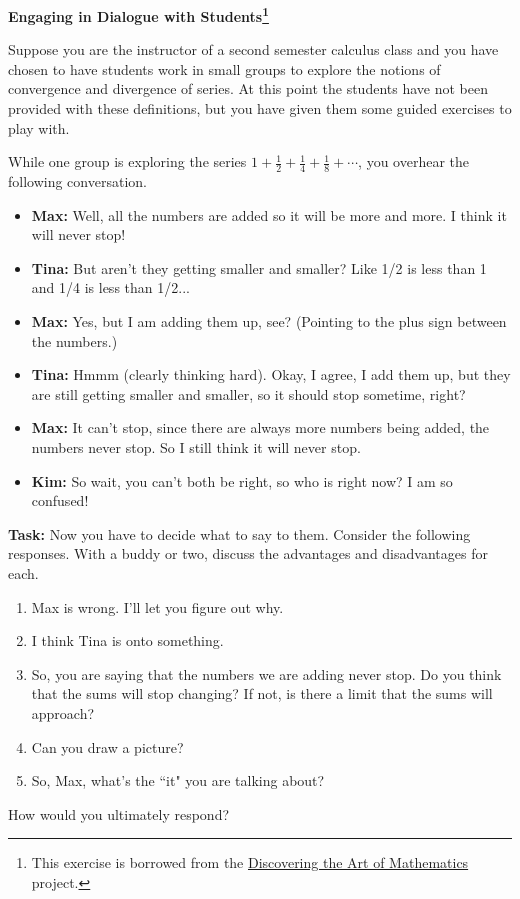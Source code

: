 \documentclass[12pt]{article}
\begin{document}
\begin{center}

{\Large\bf Engaging in Dialogue with Students\footnote{This exercise is borrowed from the \href{http://www.artofmathematics.org/}{Discovering the Art of Mathematics} project.}} 

\end{center}

\setlength{\parindent}{0pt}
\setlength{\fboxsep}{10pt}

Suppose you are the instructor of a second semester calculus class and you have chosen to have students work in small groups to explore the notions of convergence and divergence of series.  At this point the students have not been provided with these definitions, but you have given them some guided exercises to play with.

While one group is exploring the series $1+\frac{1}{2}+\frac{1}{4}+\frac{1}{8}+\cdots$, you overhear the following conversation.

\begin{itemize}
\item[] \textbf{Max:} Well, all the numbers are added so it will be more and more. I think it will never stop!
\item[] \textbf{Tina:} But aren't they getting smaller and smaller? Like 1/2 is less than 1 and 1/4 is less than 1/2...
\item[] \textbf{Max:} Yes, but I am adding them up, see? (Pointing to the plus sign between the numbers.)
\item[] \textbf{Tina:} Hmmm (clearly thinking hard). Okay, I agree, I add them up, but they are still getting smaller and smaller, so it should stop sometime, right?
\item[] \textbf{Max:} It can't stop, since there are always more numbers being added, the numbers never stop. So I still think it will never stop.
\item[] \textbf{Kim:} So wait, you can't both be right, so who is right now? I am so confused!
\end{itemize}

\textbf{Task:}  Now you have to decide what to say to them.  Consider the following responses.  With a buddy or two, discuss the advantages and disadvantages for each.

\begin{enumerate}
\item Max is wrong.  I'll let you figure out why.
\item I think Tina is onto something.
\item So, you are saying that the numbers we are adding never stop.  Do you think that the sums will stop changing?  If not, is there a limit that the sums will approach?
\item Can you draw a picture?
\item So, Max, what's the ``it" you are talking about?
\end{enumerate}

How would you ultimately respond?
\end{document}
